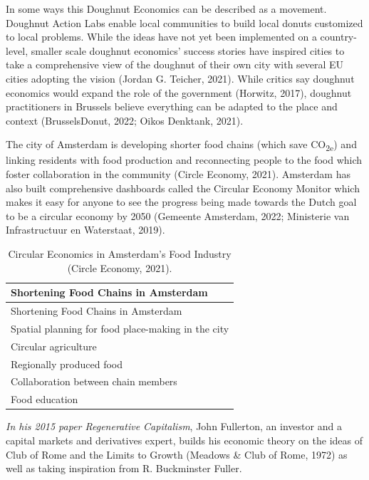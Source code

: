 \documentclass[
  12pt,
  letterpaper,
  DIV=11,
  numbers=noendperiod]{scrartcl}
\begin{document}
In some ways this Doughnut Economics can be described as a movement.
Doughnut Action Labs enable local communities to build local donuts
customized to local problems. While the ideas have not yet been
implemented on a country-level, smaller scale doughnut economics'
success stories have inspired cities to take a comprehensive view of the
doughnut of their own city with several EU cities adopting the vision
(Jordan G. Teicher, 2021). While critics say doughnut economics would
expand the role of the government (Horwitz, 2017), doughnut
practitioners in Brussels believe everything can be adapted to the place
and context (BrusselsDonut, 2022; Oikos Denktank, 2021).

The city of Amsterdam is developing shorter food chains (which save
CO\textsubscript{2e}) and linking residents with food production and
reconnecting people to the food which foster collaboration in the
community (Circle Economy, 2021). Amsterdam has also built comprehensive
dashboards called the Circular Economy Monitor which makes it easy for
anyone to see the progress being made towards the Dutch goal to be a
circular economy by 2050 (Gemeente Amsterdam, 2022; Ministerie van
Infrastructuur en Waterstaat, 2019).

\def\pandoctableshortcapt{Circular Economics in Amsterdam's Food
Industry}

\begin{longtable}[]{@{}l@{}}
\caption[Circular Economics in Amsterdam's Food Industry]{Circular
Economics in Amsterdam's Food Industry (Circle Economy,
2021).}\tabularnewline
\toprule\noalign{}
Shortening Food Chains in Amsterdam \\
\midrule\noalign{}
\endfirsthead
\toprule\noalign{}
Shortening Food Chains in Amsterdam \\
\midrule\noalign{}
\endhead
\bottomrule\noalign{}
\endlastfoot
Spatial planning for food place-making in the city \\
Circular agriculture \\
Regionally produced food \\
Collaboration between chain members \\
Food education \\
\end{longtable}

\let\pandoctableshortcapt\relax

\emph{In his 2015 paper Regenerative Capitalism}, John Fullerton, an
investor and a capital markets and derivatives expert, builds his
economic theory on the ideas of Club of Rome and the Limits to Growth
(Meadows \& Club of Rome, 1972) as well as taking inspiration from R.
Buckminster Fuller.
\end{document}
